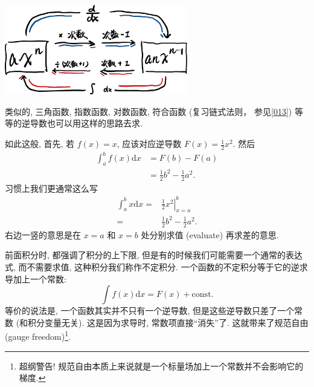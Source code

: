 \begin{tcolorbox}[size=fbox, breakable, enhanced jigsaw, title={微积分基本定理 (fundamental theorem of calculus)}]
\begin{newquote}
\begin{tcolorbox}[size=fbox, breakable, enhanced jigsaw]
\includegraphics[width=0.6\textwidth]{img/image-20230912161734076.png}

\end{tcolorbox}

类似的, 三角函数, 指数函数, 对数函数, 符合函数 (复习链式法则，
参见\ref{013}) 等等的逆导数也可以用这样的思路去求.

如此这般, 首先, 若 \(f(x)=x\), 应该对应逆导数 \(F(x)=\frac{1}{2}x^2\).
然后 \[
\begin{aligned}
  \int_a^bf(x)\mathrm{d}x&=F(b)-F(a)\\
  &=\frac{1}{2}b^2-\frac{1}{2}a^2.
\end{aligned}
\] 习惯上我们更通常这么写 \[
\begin{aligned}
\int_a^bx\mathrm{d}x=&\left.\frac{1}{2}x^2\right|_{x=a}^b\\
=&\frac{1}{2}b^2-\frac{1}{2}a^2.
\end{aligned}
\] 右边一竖的意思是在 \(x=a\) 和 \(x=b\) 处分别求值 (evaluate)
再求差的意思.
\end{newquote}

\begin{tcolorbox}[size=fbox, breakable, enhanced jigsaw, title={不定积分}]

前面积分时, 都强调了积分的上下限,
但是有的时候我们可能需要一个通常的表达式, 而不需要求值,
这种积分我们称作不定积分. 一个函数的不定积分等于它的逆求导加上一个常数:
\[
\int f(x)\mathrm{d}x=F(x)+\text{const.}
\] 等价的说法是, 一个函数其实并不只有一个逆导数,
但是这些逆导数只差了一个常数 (和积分变量无关). 这是因为求导时,
常数项直接``消失''了. 这就带来了规范自由 (gauge freedom)\footnote{超纲警告!
  规范自由本质上来说就是一个标量场加上一个常数并不会影响它的梯度.}.

\end{tcolorbox}
\end{tcolorbox}